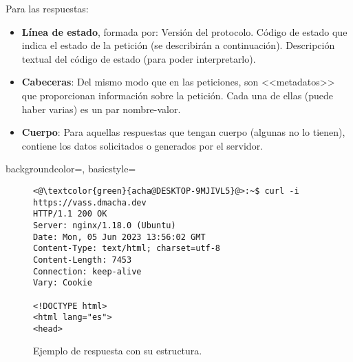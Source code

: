 Para las respuestas:
\begin{itemize}
	\item \textbf{Línea de estado}, formada por:
  \subitem Versión del protocolo.
  \subitem Código de estado que indica el estado de la petición (se describirán a continuación).
  \subitem Descripción textual del código de estado (para poder interpretarlo).
	\item \textbf{Cabeceras}: Del mismo modo que en las peticiones, son
  <<metadatos>> que proporcionan información sobre la petición. Cada una de
  ellas (puede haber varias) es un par nombre-valor.
  \item \textbf{Cuerpo}: Para aquellas respuestas que tengan cuerpo (algunas no lo tienen),
  contiene los datos solicitados o generados por el servidor.
\end{itemize}

{
    backgroundcolor=\color{black},
    basicstyle=\scriptsize\color{white}\ttfamily
}

\begin{figure}[H]
\begin{lstlisting}[style=bash]
<@\textcolor{green}{acha@DESKTOP-9MJIVL5}@>:~$ curl -i https://vass.dmacha.dev
HTTP/1.1 200 OK
Server: nginx/1.18.0 (Ubuntu)
Date: Mon, 05 Jun 2023 13:56:02 GMT
Content-Type: text/html; charset=utf-8
Content-Length: 7453
Connection: keep-alive
Vary: Cookie

<!DOCTYPE html>
<html lang="es">
<head>
\end{lstlisting}
\caption{Ejemplo de respuesta con su estructura.}
\end{figure}

